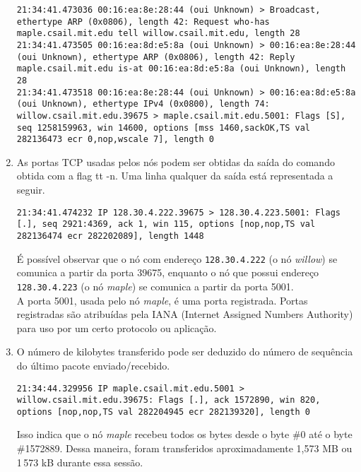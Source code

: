 \documentclass[a4paper,10pt]{article}
\begin{document}
\begin{enumerate}
\begin{lstlisting}
21:34:41.473036 00:16:ea:8e:28:44 (oui Unknown) > Broadcast, ethertype ARP (0x0806), length 42: Request who-has maple.csail.mit.edu tell willow.csail.mit.edu, length 28
21:34:41.473505 00:16:ea:8d:e5:8a (oui Unknown) > 00:16:ea:8e:28:44 (oui Unknown), ethertype ARP (0x0806), length 42: Reply maple.csail.mit.edu is-at 00:16:ea:8d:e5:8a (oui Unknown), length 28
21:34:41.473518 00:16:ea:8e:28:44 (oui Unknown) > 00:16:ea:8d:e5:8a (oui Unknown), ethertype IPv4 (0x0800), length 74: willow.csail.mit.edu.39675 > maple.csail.mit.edu.5001: Flags [S], seq 1258159963, win 14600, options [mss 1460,sackOK,TS val 282136473 ecr 0,nop,wscale 7], length 0
\end{lstlisting}


\item As portas TCP usadas pelos nós podem ser obtidas da saída do comando obtida com a flag {tt -n}. Uma linha qualquer da saída está representada a seguir.

\begin{lstlisting}
21:34:41.474232 IP 128.30.4.222.39675 > 128.30.4.223.5001: Flags [.], seq 2921:4369, ack 1, win 115, options [nop,nop,TS val 282136474 ecr 282202089], length 1448
\end{lstlisting}

É possível observar que o nó com endereço {\tt 128.30.4.222} (o nó \textit{willow}) se comunica a partir da porta 39675, enquanto o nó que possui endereço {\tt 128.30.4.223} (o nó \textit{maple}) se comunica a partir da porta 5001.\\

A porta 5001, usada pelo nó \textit{maple}, é uma porta registrada. Portas registradas são atribuídas pela IANA (Internet Assigned Numbers Authority) para uso por um certo protocolo ou aplicação.


\item O número de kilobytes transferido pode ser deduzido do número de sequência do último pacote enviado/recebido.

\begin{lstlisting}
21:34:44.329956 IP maple.csail.mit.edu.5001 > willow.csail.mit.edu.39675: Flags [.], ack 1572890, win 820, options [nop,nop,TS val 282204945 ecr 282139320], length 0
\end{lstlisting}

Isso indica que o nó \textit{maple} recebeu todos os bytes desde o byte \#0 até o byte \#1572889. Dessa maneira, foram transferidos aproximadamente 1,573 MB ou 1\,573 kB durante essa sessão.\\


\end{enumerate}
\end{document}
